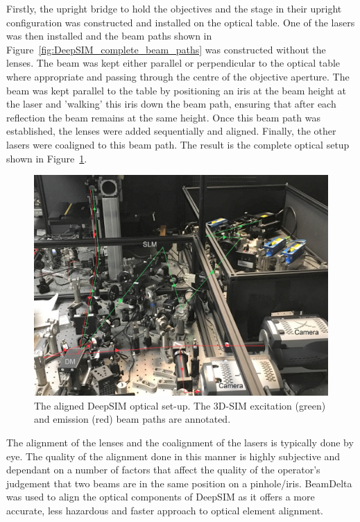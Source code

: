 Firstly, the upright bridge to hold the objectives and the stage in their upright configuration was constructed and installed on the optical table. One of the lasers was then installed and the beam paths shown in Figure~\ref{fig:DeepSIM_complete_beam_paths} was constructed without the lenses. The beam was kept either parallel or perpendicular to the optical table where appropriate and passing through the centre of the objective aperture. The beam was kept parallel to the table by positioning an iris at the beam height at the laser and 'walking' this iris down the beam path, ensuring that after each reflection the beam remains at the same height. Once this beam path was established, the lenses were added sequentially and aligned. Finally, the other lasers were coaligned to this beam path. The result is the complete optical setup shown in Figure~\ref{fig:DeepSIM_physical_optics}.

\begin{figure}[h]
	\centering
	\includegraphics[width=\textwidth]{images/DeepSIM_SIM_path_annotated_bright.jpg}
	\caption[The aligned DeepSIM optical set-up.]{The aligned DeepSIM optical set-up. The 3D-SIM excitation (green) and emission (red) beam paths are annotated.}
	\label{fig:DeepSIM_physical_optics}
\end{figure}

The alignment of the lenses and the coalignment of the lasers is typically done by eye. The quality of the alignment done in this manner is highly subjective and dependant on a number of factors that affect the quality of the operator's judgement that two beams are in the same position on a pinhole/iris. BeamDelta was used to align the optical components of DeepSIM as it offers a more accurate, less hazardous and faster approach to optical element alignment\cite{dobbie2019beamdelta}.

